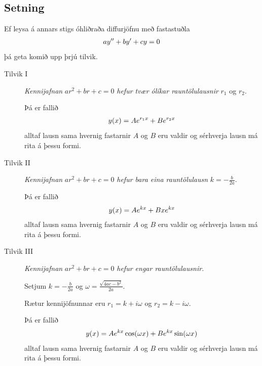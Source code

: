 \documentclass[b5paper,10pt,icelandic]{sphinxmanual}
\begin{document}
\subsection{Setning}
\label{kafli08:stigs-ohlidrud}\label{kafli08:id3}
Ef leysa á annars stigs óhliðraða diffurjöfnu með fastastuðla
\begin{gather}
\begin{split}ay''+by'+cy=0\end{split}\notag
\end{gather}
þá geta komið upp þrjú tilvik.
\begin{description}
\item[{Tilvik I}] \leavevmode
\emph{Kennijafnan} \(ar^2+br+c=0\) \emph{hefur tvær ólíkar rauntölulausnir}
\(r_1\) og \(r_2\).

Þá er fallið
\begin{gather}
\begin{split}y(x)=Ae^{r_1x}+Be^{r_2x}\end{split}\notag
\end{gather}
alltaf lausn sama hvernig fastarnir \(A\) og \(B\) eru
valdir og sérhverja lausn má rita á þessu formi.

\item[{Tilvik II}] \leavevmode
\emph{Kennijafnan} \(ar^2+br+c=0\) \emph{hefur bara eina rauntölulausn}
\(k=-\frac{b}{2a}\).

Þá er fallið
\begin{gather}
\begin{split}y(x)=Ae^{kx}+Bxe^{kx}\end{split}\notag
\end{gather}
alltaf lausn sama hvernig fastarnir \(A\) og \(B\) eru
valdir og sérhverja lausn má rita á þessu formi.

\item[{Tilvik III}] \leavevmode
\emph{Kennijafnan} \(ar^2+br+c=0\) \emph{hefur engar rauntölulausnir.}

Setjum \(k=-\frac{b}{2a}\) og
\(\omega=\frac{\sqrt{4ac-b^2}}{2a}\).

Rætur kennijöfnunnar eru \(r_1=k+i\omega\) og
\(r_2=k-i\omega\).

Þá er fallið
\begin{gather}
\begin{split}y(x)=Ae^{kx}\cos(\omega x)+Be^{kx}\sin(\omega x)\end{split}\notag
\end{gather}
alltaf lausn sama hvernig fastarnir \(A\) og \(B\) eru
valdir og sérhverja lausn má rita á þessu formi.

\end{description}
\end{document}

